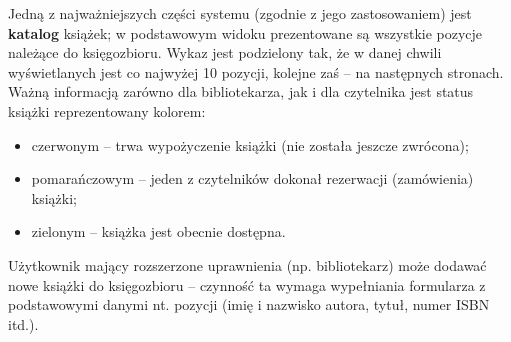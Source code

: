 \documentclass[12pt, a4paper]{article}
\begin{document}
Jedną z najważniejszych części systemu (zgodnie z jego zastosowaniem) jest \textbf{katalog} książek; w podstawowym widoku prezentowane są wszystkie pozycje należące do księgozbioru. Wykaz jest podzielony tak, że w danej chwili wyświetlanych jest co najwyżej 10 pozycji, kolejne zaś -- na następnych stronach. Ważną informacją zarówno dla bibliotekarza, jak i dla czytelnika jest status książki reprezentowany kolorem:

\begin{itemize}
    \item czerwonym     -- trwa wypożyczenie książki (nie została jeszcze zwrócona);
    \item pomarańczowym -- jeden z czytelników dokonał rezerwacji (zamówienia) książki;
    \item zielonym      -- książka jest obecnie dostępna.
\end{itemize}

Użytkownik mający rozszerzone uprawnienia (np. bibliotekarz) może dodawać nowe książki do księgozbioru -- czynność ta wymaga wypełniania formularza z podstawowymi danymi nt. pozycji (imię i nazwisko autora, tytuł, numer ISBN itd.).
\end{document}
